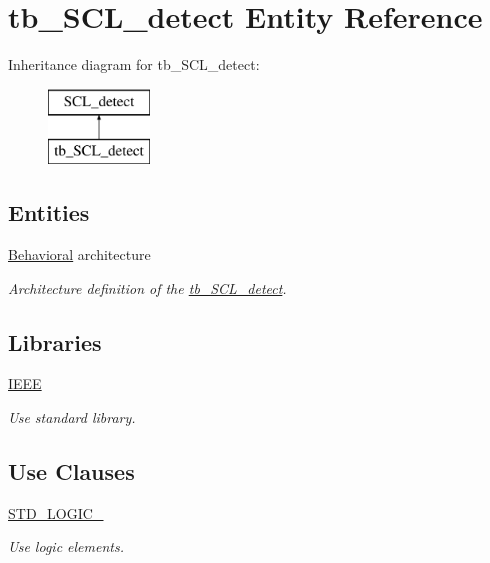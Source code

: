 \hypertarget{classtb___s_c_l__detect}{}\section{tb\+\_\+\+S\+C\+L\+\_\+detect Entity Reference}
\label{classtb___s_c_l__detect}
Inheritance diagram for tb\+\_\+\+S\+C\+L\+\_\+detect\+:\begin{figure}[H]
\begin{center}
\leavevmode
\includegraphics[height=2.000000cm]{classtb___s_c_l__detect}
\end{center}
\end{figure}
\subsection*{Entities}
\begin{DoxyCompactItemize}
\item 
\hyperlink{classtb___s_c_l__detect_1_1_behavioral}{Behavioral} architecture
\begin{DoxyCompactList}\small\item\em Architecture definition of the \hyperlink{classtb___s_c_l__detect}{tb\+\_\+\+S\+C\+L\+\_\+detect}. \end{DoxyCompactList}\end{DoxyCompactItemize}
\subsection*{Libraries}
 \begin{DoxyCompactItemize}
\item 
\hyperlink{classtb___s_c_l__detect_ae4f03c286607f3181e16b9aa12d0c6d4}{I\+E\+EE} \hypertarget{classtb___s_c_l__detect_ae4f03c286607f3181e16b9aa12d0c6d4}{}\label{classtb___s_c_l__detect_ae4f03c286607f3181e16b9aa12d0c6d4}

\begin{DoxyCompactList}\small\item\em Use standard library. \end{DoxyCompactList}\end{DoxyCompactItemize}
\subsection*{Use Clauses}
 \begin{DoxyCompactItemize}
\item 
\hyperlink{classtb___s_c_l__detect_aa4b2b25246a821511120e3149b003563}{S\+T\+D\+\_\+\+L\+O\+G\+I\+C\+\_}   \hypertarget{classtb___s_c_l__detect_aa4b2b25246a821511120e3149b003563}{}\label{classtb___s_c_l__detect_aa4b2b25246a821511120e3149b003563}

\begin{DoxyCompactList}\small\item\em Use logic elements. \end{DoxyCompactList}\end{DoxyCompactItemize}


